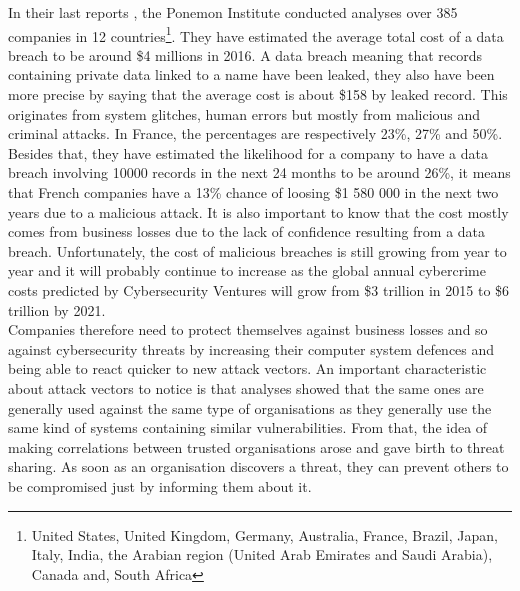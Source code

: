 \documentclass{eplmastersthesis}
\begin{document}
In their last reports \cite{ponemon2016cost, ponemon2016costFr}, the Ponemon Institute conducted analyses over 385 companies in 12 countries\footnote{United States, United Kingdom, Germany, Australia, France, Brazil, Japan, Italy, India, the Arabian region (United Arab Emirates and Saudi Arabia), Canada and, South Africa}. They have estimated the average total cost of a data breach to be around \$4 millions in 2016. A data breach meaning that records containing private data linked to a name have been leaked, they also have been more precise by saying that the average cost is about \$158 by leaked record. This originates from system glitches, human errors but mostly from malicious and criminal attacks. In France, the percentages are respectively 23\%, 27\% and 50\%. Besides that, they have estimated the likelihood for a company to have a data breach involving 10000 records in the next 24 months to be around 26\%, it means that French companies have a 13\% chance of loosing \$1 580 000 in the next two years due to a malicious attack. It is also important to know that the cost mostly comes from business  losses due to the lack of confidence resulting from a data breach. Unfortunately, the cost of malicious breaches is still growing from year to year and it will probably continue to increase as the global annual cybercrime costs predicted by Cybersecurity Ventures will grow from  \$3 trillion in 2015 to \$6 trillion by 2021.\\

Companies therefore need to protect themselves against business losses and so against cybersecurity threats by increasing their computer system defences and being able to react quicker to new attack vectors. An important characteristic about attack vectors to notice is that analyses showed that the same ones are generally used against the same type of organisations as they generally use the same kind of systems containing similar vulnerabilities. From that, the idea of making correlations between trusted organisations arose and gave birth to threat sharing.  As soon as an organisation discovers a threat, they can prevent others to be compromised just by informing them about it.\\
\end{document}
